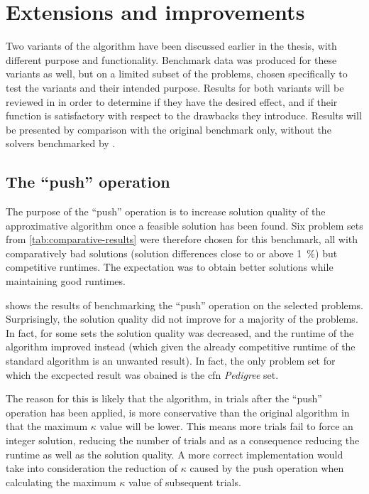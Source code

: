\section{Extensions and improvements}
Two variants of the algorithm have been discussed earlier in the thesis, with different purpose and functionality.
Benchmark data was produced for these variants as well, but on a limited subset of the problems, chosen specifically to test the variants and their intended purpose.
Results for both variants will be reviewed in in order to determine if they have the desired effect, and if their function is satisfactory with respect to the drawbacks they introduce.
Results will be presented by comparison with the original benchmark only, without the solvers benchmarked by \textcite{deGivry14}.


\subsection{The \enquote{push} operation}
The purpose of the \enquote{push} operation is to increase solution quality of the approximative algorithm once a feasible solution has been found.
Six problem sets from \cref{tab:comparative-results} were therefore chosen for this benchmark, all with comparatively bad solutions (solution differences close to or above \SI{1}{\percent}) but competitive runtimes.
The expectation was to obtain better solutions while maintaining good runtimes.

 shows the results of benchmarking the \enquote{push} operation on the selected problems.
Surprisingly, the solution quality did not improve for a majority of the problems.
In fact, for some sets the solution quality was decreased, and the runtime of the algorithm improved instead (which given the already competitive runtime of the standard algorithm is an unwanted result).
In fact, the only problem set for which the excpected result was obained is the \gls{cfn} \emph{Pedigree} set.

The reason for this is likely that the algorithm, in trials after the \enquote{push} operation has been applied, is more conservative than the original algorithm in that the maximum \(\kappa\) value will be lower. This means more trials fail to force an integer solution, reducing the number of trials and as a consequence reducing the runtime as well as the solution quality.
A more correct implementation would take into consideration the reduction of \(\kappa\) caused by the push operation when calculating the maximum \(\kappa\) value of subsequent trials.

